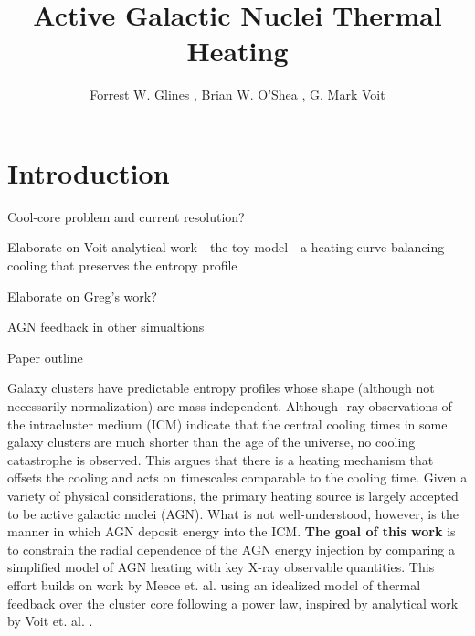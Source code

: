 \documentclass[iop,apjl, twocolappendix]{emulateapj}   %
\begin{document}
\title{Active Galactic Nuclei Thermal Heating}

\author{
  Forrest W. Glines , Brian W. O'Shea , G. Mark Voit
}


\label{firstpage}

\begin{abstract}
\end{abstract}

\keywords{}

\section{Introduction}
\label{sec:introduction}


\textbullet Cool-core problem and current resolution?

\textbullet Elaborate on Voit analytical work - the toy model - a heating curve balancing
cooling that preserves the entropy profile

\textbullet Elaborate on Greg's work?

\textbullet AGN feedback in other simualtions

\textbullet Paper outline

Galaxy clusters have predictable entropy profiles whose shape (although not
necessarily normalization) are mass-independent.
\cite{cavagnolo_intracluster_2009} Although -ray observations of the
intracluster medium (ICM) indicate that the central cooling times  in some
galaxy clusters are much shorter than the age of the universe, no cooling
catastrophe is observed. This argues that there is a heating mechanism that
offsets the cooling and acts on timescales comparable to the cooling time.
Given a variety of physical considerations, the primary heating source is
largely accepted to be active galactic nuclei (AGN).  What is not
well-understood, however, is the manner in which AGN deposit energy into the
ICM.   \textbf{The goal of this work} is to constrain the radial dependence of
the AGN energy injection by comparing a simplified model of AGN heating with
key X-ray observable quantities. This effort builds on work by Meece et. al.
\cite{meece_jr_agn_2016,meece_triggering_2017} using an idealized model of
thermal feedback over the cluster core following a power law, inspired by
analytical work by Voit et. al.
\cite{voit_global_2017}.
\end{document}
